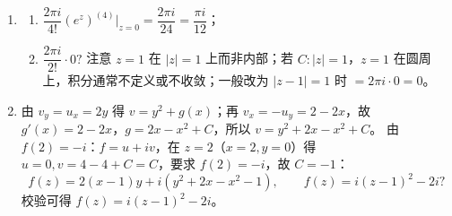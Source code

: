 \begin{enumerate}
\begin{enumerate}
    \(\oint_C\dfrac{\sin z}{z}dz=2\pi i\sin0=0\)。
  \end{enumerate}
\item
  \begin{enumerate}
  \def\labelenumii{(\arabic{enumii})}
  \tightlist
  \item
    \(\dfrac{2\pi i}{4!}\left(e^z\right)^{(4)}\big|_{z=0}=\dfrac{2\pi i}{24}=\dfrac{\pi i}{12}\)；
  \item
    \(\dfrac{2\pi i}{2!}\cdot 0?\) 注意 \(z=1\) 在 \(|z|=1\)
    上而非内部；若 \(C:|z|=1\)，\(z=1\)
    在圆周上，积分通常不定义或不收敛；一般改为 \(|z-1|=1\) 时
    \(=2\pi i\cdot0=0\)。
  \end{enumerate}
\item
  由 \(v_y=u_x=2y\) 得 \(v=y^2+g(x)\)；再 \(v_x=-u_y=2-2x\)，故
  \(g'(x)=2-2x\)，\(g=2x-x^2+C\)，所以 \(v=y^2+2x-x^2+C\)。 由
  \(f(2)=-i\)：\(f=u+iv\)，在 \(z=2\)（\(x=2,y=0\)）得
  \(u=0,v=4-4+C=C\)，要求 \(f(2)=-i\)，故 \(C=-1\)： \[
  f(z)=2(x-1)y+i(y^2+2x-x^2-1),\qquad f(z)=i(z-1)^2-2i? 
  \] 校验可得 \(f(z)=i(z-1)^2-2i\)。
\end{enumerate}
